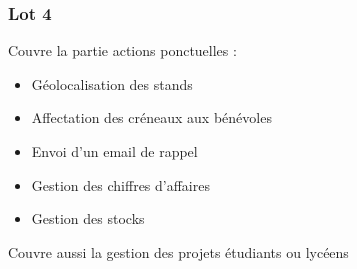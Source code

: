 \begin{frame}
	\frametitle{Lot 4}
	Couvre la partie actions ponctuelles :
	\begin{itemize}
		\item Géolocalisation des stands
		\item Affectation des créneaux aux bénévoles
		\item Envoi d'un email de rappel
		\item Gestion des chiffres d'affaires
		\item Gestion des stocks
	\end{itemize}
	Couvre aussi la gestion des projets étudiants ou lycéens
\end{frame}